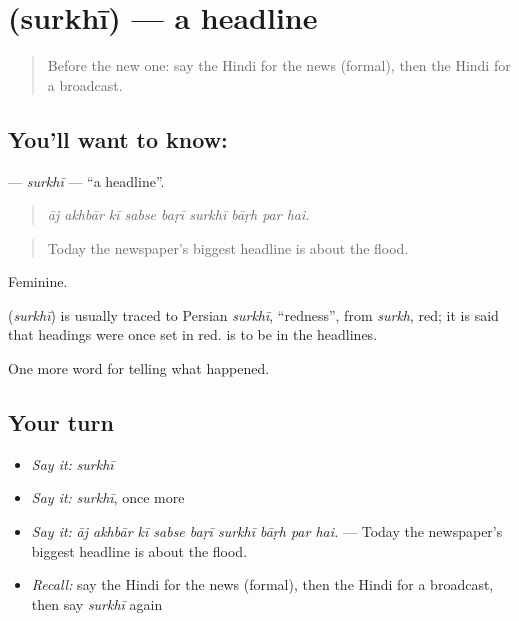 \section[\texorpdfstring{\hi{सुर्ख़ी} (surkhī)}{सुर्ख़ी (surkhī)}]{ (surkhī) — a headline}

\label{lesson:HI-C312-surkhi}



\begin{quote}
Before the new one: say the Hindi for the news (formal), then the Hindi for a broadcast.
\end{quote}

\subsection*{You'll want to know: }
\textbf{} — \emph{surkhī} — \textquotedblleft{}a headline\textquotedblright{}.

\begin{quote}
        
\end{quote}

\begin{quote}
\emph{āj akhbār kī sabse baṛī surkhī bāṛh par hai.}
\end{quote}

\begin{quote}
Today the newspaper's biggest headline is about the flood.
\end{quote}

Feminine.

\begin{cousinweb}
\textbf{} (\emph{surkhī}) is usually traced to Persian \emph{surkhī}, \textquotedblleft{}redness\textquotedblright{}, from \emph{surkh}, red; it is said that headings were once set in red. \textbf{  } is to be in the headlines.
\end{cousinweb}

\begin{grammarlens}[title={What you've built}]
One more word for telling what happened.
\end{grammarlens}

\subsection*{Your turn}
\begin{itemize}
\raggedright
  \item \emph{Say it:} \emph{surkhī}
  \item \emph{Say it:} \emph{surkhī}, once more
  \item \emph{Say it:} \emph{āj akhbār kī sabse baṛī surkhī bāṛh par hai.} — Today the newspaper's biggest headline is about the flood.
  \item \emph{Recall:} say the Hindi for the news (formal), then the Hindi for a broadcast, then say \emph{surkhī} again
\end{itemize}

